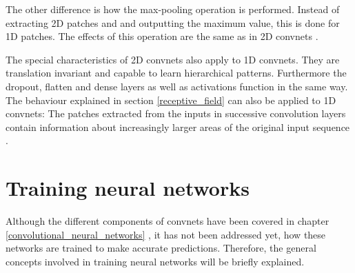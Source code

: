 The other difference is how the max-pooling operation is performed. Instead of extracting 2D patches and and outputting the maximum value, this is done for 1D patches. The effects of this operation are the same as in 2D convnets \cite[Chaper~6]{cnn}. 

The special characteristics of 2D convnets also apply to 1D convnets. They are translation invariant and capable to learn hierarchical patterns. Furthermore the dropout, flatten and dense layers as well as activations function in the same way. The behaviour explained in section \ref{receptive_field}  can also be applied to 1D convnets: The patches extracted from the inputs in successive convolution layers contain information about increasingly larger areas of the original input sequence \cite[Chaper~6]{cnn}.

\chapter{Training neural networks}
\label{training_neural_networks}
Although the different components of convnets have been covered in chapter \ref{convolutional_neural_networks} , it has not been addressed yet, how these networks are trained to make accurate predictions. Therefore, the general concepts involved in training neural networks will be briefly explained.  

